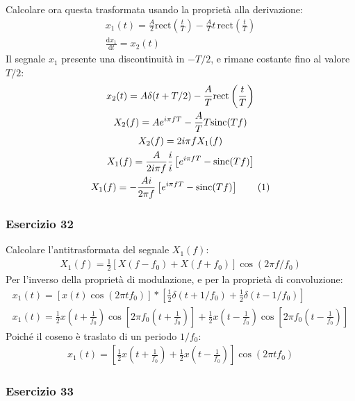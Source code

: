 \documentclass{article}
\newcommand{\rect}{\mathrm{rect}}
\newcommand{\sinc}{\mathrm{sinc}}
\newcommand{\df}{\mathrm{d}}
\newcommand{\tageq}{\tag{\stepcounter{equation}\theequation}}
\begin{document}
Calcolare ora questa trasformata usando la proprietà alla derivazione:
\begin{gather*}
    x_1(t)=\displaystyle\frac{A}{2}\rect\left(\frac{t}{T}\right)-\frac{A}{T}t\,\rect\left(\frac{t}{T}\right)\\
    \displaystyle\frac{\df x_1}{\df t}=x_2(t)
\end{gather*}
Il segnale $x_1$ presente una discontinuità in $-T/2$, e rimane costante fino al valore $T/2$:
\begin{gather*}
    x_2(t)=A\delta(t+T/2)-\displaystyle\frac{A}{T}\rect\left(\frac{t}{T}\right)\\
    X_2(f)=Ae^{i\pi fT}-\displaystyle\frac{A}{T}T\sinc(Tf)\\
    X_2(f)=2i\pi fX_1(f)\\
    X_1(f)=\displaystyle\frac{A}{2i\pi f}\frac{i}{i}\left[e^{i\pi fT}-\sinc(Tf)\right]\\
    X_1(f)=\displaystyle-\frac{Ai}{2\pi f}\left[e^{i\pi fT}-\sinc(Tf)\right]\tageq
\end{gather*}

\subsubsection*{Esercizio 32}

Calcolare l'antitrasformata del segnale $X_1(f)$:
\begin{gather*}
    X_1(f)=\displaystyle\frac{1}{2}\left[X(f-f_0)+X(f+f_0)\right]\cos(2\pi f/f_0)
\end{gather*}
Per l'inverso della proprietà di modulazione, e per la proprietà di convoluzione:
\begin{gather*}
    x_1(t)=\left[x(t)\cos(2\pi tf_0)\right]*\left[\displaystyle\frac{1}{2}\delta(t+1/f_0)+\frac{1}{2}\delta(t-1/f_0)\right]\\
    x_1(t)=\displaystyle\frac{1}{2}x\left(t+\frac{1}{f_0}\right)\cos\left[2\pi f_0\left(t+\frac{1}{f_0}\right)\right]+\frac{1}{2}x\left(t-\frac{1}{f_0}\right)\cos\left[2\pi f_0\left(t-\frac{1}{f_0}\right)\right]
\end{gather*}
Poiché il coseno è traslato di un periodo $1/f_0$: 
\begin{gather}
    x_1(t)=\left[\displaystyle\frac{1}{2}x\left(t+\frac{1}{f_0}\right)+\frac{1}{2}x\left(t-\frac{1}{f_0}\right)\right]\cos(2\pi tf_0)
\end{gather}

\subsubsection*{Esercizio 33}
\end{document}
